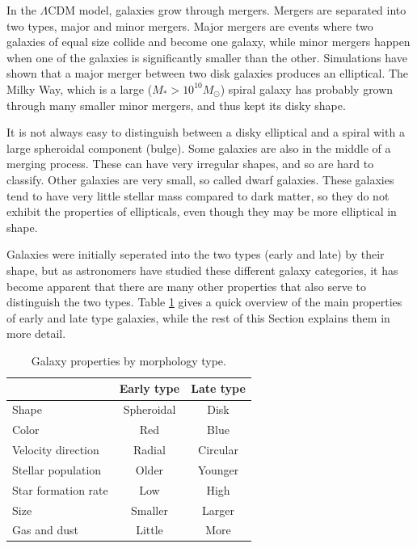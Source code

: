 In the $\Lambda$CDM model, galaxies grow through mergers. Mergers are separated into two types, major and minor mergers. Major mergers are events where two galaxies of equal size collide and become one galaxy, while minor mergers happen when one of the galaxies is significantly smaller than the other. Simulations have shown that a major merger between two disk galaxies produces an elliptical. The Milky Way, which is a large ($M_*>10^{10} M_\odot$) spiral galaxy has probably grown through many smaller minor mergers, and thus kept its disky shape.

It is not always easy to distinguish between a disky elliptical and a spiral with a large spheroidal component (bulge). Some galaxies are also in the middle of a merging process. These can have very irregular shapes, and so are hard to classify. Other galaxies are very small, so called dwarf galaxies. These galaxies tend to have very little stellar mass compared to dark matter, so they do not exhibit the properties of ellipticals, even though they may be more elliptical in shape.

Galaxies were initially seperated into the two types (early and late) by their shape, but as astronomers have studied these different galaxy categories, it has become apparent that there are many other properties that also serve to distinguish the two types. Table \ref{morphologies} gives a quick overview of the main properties of early and late type galaxies, while the rest of this Section explains them in more detail.


\begin{table}
\begin{center}
\caption{Galaxy properties by morphology type.}
\label{morphologies}
\begin{tabular} { l| c c } 
 \hline
 \hline
  & Early type & Late type \\
 \hline
 Shape & Spheroidal & Disk \\
 Color & Red & Blue \\
 Velocity direction& Radial & Circular \\
 Stellar population & Older & Younger \\
 Star formation rate & Low & High \\
 Size & Smaller & Larger \\
 Gas and dust & Little & More \\
  
 \hline 
\end{tabular}
\end{center}
\end{table}

